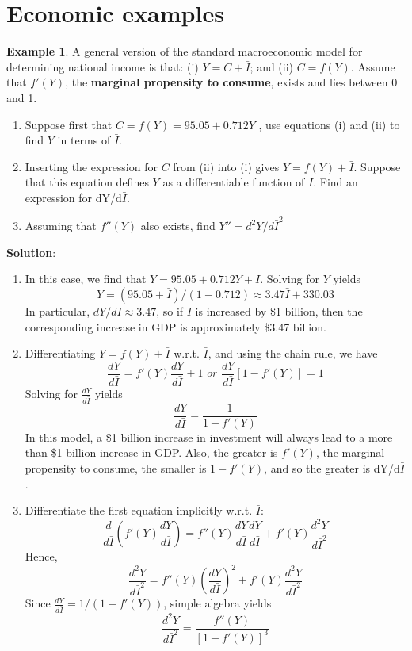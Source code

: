 \documentclass[10pt,a4paper]{book}
\theoremstyle{definition}\newtheorem{definition}{Definition}
\theoremstyle{definition}\newtheorem{fact}{Fact}
\theoremstyle{definition}\newtheorem{ex}{Ex.}
\theoremstyle{definition}\newtheorem{project}{Project}
\theoremstyle{definition}\newtheorem{problem}{Problem}
\theoremstyle{definition}\newtheorem{example}{Example}
\numberwithin{theorem}{chapter}
\numberwithin{corollary}{chapter}
\numberwithin{assumption}{chapter}
\numberwithin{definition}{chapter}
\numberwithin{prop}{chapter}
\numberwithin{notation}{chapter}
\numberwithin{problem}{chapter}
\numberwithin{example}{chapter}
\numberwithin{fact}{chapter}
\numberwithin{ex}{chapter}
\begin{document}
	\section{Economic examples}
	
	\begin{example}
		A general version of the standard macroeconomic model for determining national income is that: (i) $Y = C + \bar{I}$; and (ii) $C = f (Y)$.
		Assume that $f'(Y)$, the \textbf{marginal propensity to consume}, exists and lies between 0 and 1.
		\begin{enumerate}[label=(\alph*)]
			\item Suppose first that $C = f (Y) = 95.05 + 0.712Y$ , use
			equations (i) and (ii) to find $Y$ in terms of $\bar{I}$.
			\item Inserting the expression for $C$ from (ii) into (i) gives $Y = f (Y ) + \bar{I}$. Suppose that this equation defines $Y$ as a differentiable function of $I$. Find an expression for dY/d$\bar{I}$.
			\item Assuming that $f''(Y)$ also exists, find $Y''=d^2Y/d\bar{I}^2$
		\end{enumerate}
		
		\textbf{Solution}:
		\begin{enumerate}[label=(\alph*)]
			\item In this case, we find that $Y = 95.05 + 0.712Y + \bar{I}$. Solving for $Y$ yields
			$$Y = (95.05 + \bar{I})/(1 - 0.712) \approx 3.47\bar{I} + 330.03$$
			In particular, $dY/dI \approx 3.47$, so if $I$ is increased by \$1 billion, then the corresponding increase in GDP is approximately \$3.47 billion.
			\item Differentiating $Y = f (Y ) + \bar{I}$ w.r.t. $\bar{I}$, and using the chain rule, we have
			$$\frac{dY}{d\bar{I}}=f'(Y)\frac{dY}{d\bar{I}}+1 \,\,or\,\, \frac{dY}{d\bar{I}}[1-f'(Y)]=1$$
			Solving for $\frac{dY}{d\bar{I}}$ yields
			$$\frac{dY}{d\bar{I}}=\frac{1}{1-f'(Y)}$$
			In this model, a \$1 billion increase in investment will always lead to a more than \$1 billion increase in GDP. Also, the greater is $f'(Y)$, the marginal propensity to consume, the smaller is $1 - f'(Y)$, and so the greater is dY/d$\bar{I}$.
			\item Differentiate the first equation implicitly w.r.t. $\bar{I}$:
			$$\frac{d}{d\bar{I}}\left( f'(Y)\frac{dY}{d\bar{I}} \right) = f''(Y)\frac{dY}{d\bar{I}}\frac{dY}{d\bar{I}}+f'(Y)\frac{d^2Y}{d\bar{I}^2}$$
			Hence,
			$$\frac{d^2Y}{d\bar{I}^2}=f''(Y) \left( \frac{dY}{d\bar{I}} \right)^2 + f'(Y) \frac{d^2Y}{d\bar{I}^2}$$
			Since $\frac{dY}{d\bar{I}}=1/(1-f'(Y))$, simple algebra yields
			$$\frac{d^2Y}{d\bar{I}^2}=\frac{f''(Y)}{[1-f'(Y)]^3}$$
		\end{enumerate}
	\end{example}
	
\end{document}

